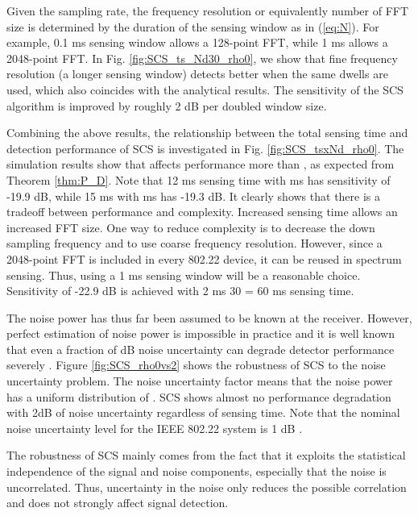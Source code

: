 \documentclass[draftclsnofoot,onecolumn,12pt]{IEEEtran}
\begin{document}
Given the sampling rate, the frequency resolution or equivalently number of FFT size  is determined
by the duration of the sensing window  as in (\ref{eq:N}). For example, 0.1 ms sensing window allows
a 128-point FFT, while 1 ms allows a 2048-point FFT. In Fig. \ref{fig:SCS_ts_Nd30_rho0}, we show
that fine frequency resolution (a longer sensing window) detects better when the same dwells are
used, which also coincides with the analytical results.
The sensitivity of the SCS algorithm is improved by roughly 2 dB per doubled window size.


Combining the above results, the relationship between the total sensing time  and
detection performance of SCS is investigated in Fig. \ref{fig:SCS_tsxNd_rho0}.
The simulation results show that  affects performance more than ,
as expected from Theorem \ref{thm:P_D}.
Note that 12 ms sensing time with  ms has sensitivity of -19.9 dB, while 15 ms with  ms has -19.3 dB.
It clearly shows that there is a tradeoff between performance and complexity.
Increased sensing time allows an increased FFT size.
One way to reduce complexity is to decrease the down sampling frequency
 and to use coarse frequency resolution. However, since a 2048-point FFT is included in every 802.22 device,
it can be reused in spectrum sensing. Thus, using a 1 ms sensing window will be a reasonable choice.
Sensitivity of -22.9 dB is
achieved with 2 ms  30 = 60 ms sensing time.






The noise power has thus far been assumed to be known at the receiver. However, perfect
estimation of noise power is impossible in practice and it is well known that even
a fraction of dB noise uncertainty can degrade detector performance severely \cite{TanSah08}.
Figure \ref{fig:SCS_rho0vs2} shows the robustness of SCS to the noise uncertainty problem.
The noise uncertainty factor  means that the noise
power has a uniform distribution of .  SCS shows almost
no performance degradation with 2dB of noise uncertainty regardless of sensing time.
Note that the nominal noise uncertainty level for the IEEE 802.22 system is 1 dB \cite{802.22_Req}.


The robustness of SCS mainly comes from the fact that it exploits the statistical independence of
the signal and noise components, especially that the noise is uncorrelated. Thus, uncertainty in the noise
only reduces the possible correlation and does not strongly affect signal detection.
\end{document}
